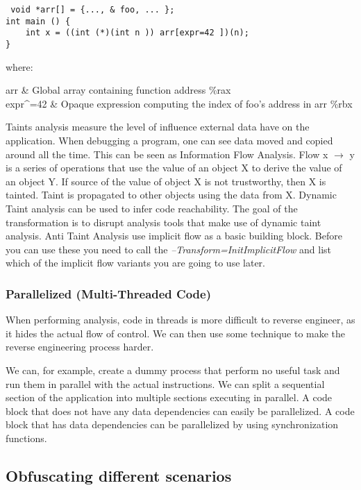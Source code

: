  \begin{lstlisting}
 void *arr[] = {..., & foo, ... };
int main () {
    int x = ((int (*)(int n )) arr[expr=42 ])(n);
}
 \end{lstlisting}
where: 
\begin{conditions}
 arr        &  Global array containing function address \%rax \\
 expr^{=42} &  Opaque expression computing the index of foo's address in arr \%rbx 
\end{conditions}

Taints analysis measure the level of influence external data have on the application. 
When debugging a program, one can see data moved and copied around all the time. 
This can be seen as Information Flow Analysis. 
Flow x $\rightarrow$ y is a series of operations that use the value of an object X to derive the value of an object Y. If source of the value of object X is not trustworthy, then X is tainted. 
Taint is propagated to other objects using the data from X. 
Dynamic Taint analysis can be used to infer code reachability. 
The goal of the transformation is to disrupt analysis tools that make use of dynamic taint analysis. 
Anti Taint Analysis use implicit flow as a basic building block. Before you can use these you need to call the \textit{--Transform=InitImplicitFlow} and list which of the implicit flow variants you are going to use later.

\subsubsection{Parallelized (Multi-Threaded Code)}

When performing analysis, code in threads is more difficult to reverse engineer, as it hides the actual flow of control. We can then use some technique to make the reverse engineering process harder.\newline
\par 
We can, for example, create a dummy process that perform no useful task and run them in  parallel with the actual instructions. 
We can split a sequential section of the application into multiple sections executing in parallel. 
A code block that does not have any data dependencies can easily be parallelized. 
A code block that has data dependencies can be parallelized by using synchronization functions. 

\subsection{Obfuscating different scenarios}

